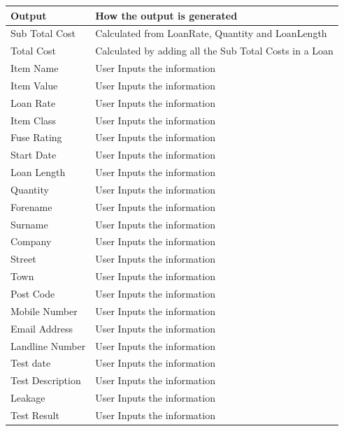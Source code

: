 \begin{center}
    \begin{longtable}{|p{6cm}|p{6cm}|}
        \hline
        \textbf{Output}  & \textbf{How the output is generated} \\ \hline
        Sub Total Cost   & Calculated from LoanRate, Quantity and LoanLength \\ \hline
        Total Cost       & Calculated by adding all the Sub Total Costs in a Loan \\ \hline
        Item Name        & User Inputs the information \\ \hline
        Item Value       & User Inputs the information \\ \hline
        Loan Rate        & User Inputs the information \\ \hline
        Item Class       & User Inputs the information \\ \hline
        Fuse Rating      & User Inputs the information \\ \hline
        Start Date       & User Inputs the information \\ \hline
        Loan Length      & User Inputs the information \\ \hline
        Quantity         & User Inputs the information \\ \hline
        Forename         & User Inputs the information \\ \hline
        Surname          & User Inputs the information \\ \hline
        Company          & User Inputs the information \\ \hline
        Street           & User Inputs the information \\ \hline
        Town             & User Inputs the information \\ \hline
        Post Code        & User Inputs the information \\ \hline
        Mobile Number    & User Inputs the information \\ \hline
        Email Address    & User Inputs the information \\ \hline
        Landline Number  & User Inputs the information \\ \hline
        Test date        & User Inputs the information \\ \hline
        Test Description & User Inputs the information \\ \hline
        Leakage          & User Inputs the information \\ \hline
        Test Result      & User Inputs the information \\ \hline
    \end{longtable}

\end{center}


